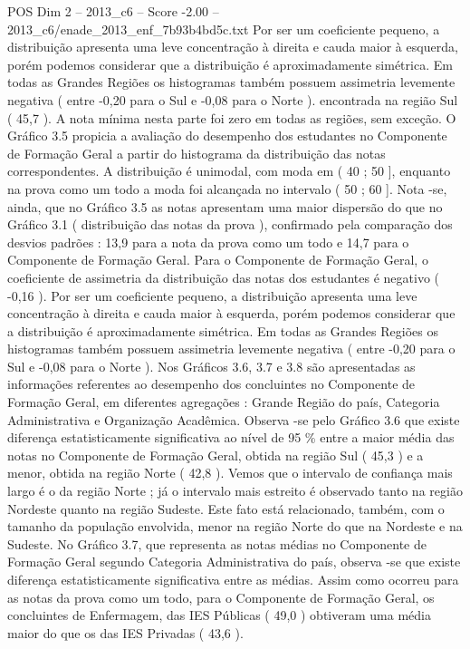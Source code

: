 \begin{textsample}{POS Dim 2 – 2013\_c6 – Score -2.00 – 2013\_c6/enade\_2013\_enf\_7b93b4bd5c.txt}
Por ser um coeficiente pequeno, a distribuição apresenta uma leve concentração à direita e cauda maior à esquerda, porém podemos considerar que a distribuição é aproximadamente simétrica.
Em todas as Grandes Regiões os histogramas também possuem assimetria levemente negativa ( entre -0,20 para o Sul e -0,08 para o Norte ). encontrada na região Sul ( 45,7 ).
A nota mínima nesta parte foi zero em todas as regiões, sem exceção.
O Gráfico 3.5 propicia a avaliação do desempenho dos estudantes no Componente de Formação Geral a partir do histograma da distribuição das notas correspondentes.
A distribuição é unimodal, com moda em ( 40 ; 50 ], enquanto na prova como um todo a moda foi alcançada no intervalo ( 50 ; 60 ].
Nota -se, ainda, que no Gráfico 3.5 as notas apresentam uma maior dispersão do que no Gráfico 3.1 ( distribuição das notas da prova ), confirmado pela comparação dos desvios padrões : 13,9 para a nota da prova como um todo e 14,7 para o Componente de Formação Geral.
Para o Componente de Formação Geral, o coeficiente de assimetria da distribuição das notas dos estudantes é negativo ( -0,16 ).
Por ser um coeficiente pequeno, a distribuição apresenta uma leve concentração à direita e cauda maior à esquerda, porém podemos considerar que a distribuição é aproximadamente simétrica.
Em todas as Grandes Regiões os histogramas também possuem assimetria levemente negativa ( entre -0,20 para o Sul e -0,08 para o Norte ).
Nos Gráficos 3.6, 3.7 e 3.8 são apresentadas as informações referentes ao desempenho dos concluintes no Componente de Formação Geral, em diferentes agregações : Grande Região do país, Categoria Administrativa e Organização Acadêmica.
Observa -se pelo Gráfico 3.6 que existe diferença estatisticamente significativa ao nível de 95 \% entre a maior média das notas no Componente de Formação Geral, obtida na região Sul ( 45,3 ) e a menor, obtida na região Norte ( 42,8 ).
Vemos que o intervalo de confiança mais largo é o da região Norte ; já o intervalo mais estreito é observado tanto na região Nordeste quanto na região Sudeste.
Este fato está relacionado, também, com o tamanho da população envolvida, menor na região Norte do que na Nordeste e na Sudeste.
No Gráfico 3.7, que representa as notas médias no Componente de Formação Geral segundo Categoria Administrativa do país, observa -se que existe diferença estatisticamente significativa entre as médias.
Assim como ocorreu para as notas da prova como um todo, para o Componente de Formação Geral, os concluintes de Enfermagem, das IES Públicas ( 49,0 ) obtiveram uma média maior do que os das IES Privadas ( 43,6 ).

\end{textsample}
